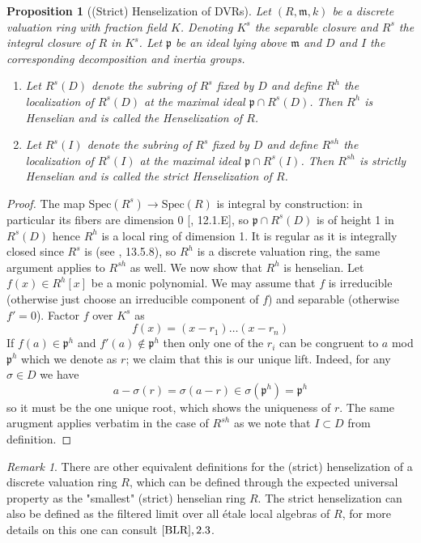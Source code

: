 \documentclass{article}
\theoremstyle{definition}
\theoremstyle{remark}
\newtheorem*{remark}{Remark}
\theoremstyle{plain}
\newtheorem{proposition}[theorem]{Proposition}
\newcommand{\mk}[1]{\mathfrak{#1}}
\newcommand{\ic}{\cap}
\begin{document}
\begin{proposition}[(Strict) Henselization of DVRs]
	Let $(R, \mk{m}, k)$ be a discrete valuation ring with fraction field $K$.
	Denoting $K^s$ the separable closure and $R^s$ the integral closure of $R$ in $K^s$. 
	Let $\mk{p}$ be an ideal lying above $\mk{m}$ and $D$ and $I$ the corresponding decomposition and inertia groups.
	\begin{enumerate}
		\item Let $R^s(D)$ denote the subring of $R^s$ fixed by $D$ and define $R^h$ the localization of $R^s(D)$ at the maximal ideal $\mk{p} \ic R^s(D)$.
		Then $R^h$ is Henselian and is called the \textit{Henselization} of $R$.
	\item Let $R^s(I)$ denote the subring of $R^{s}$ fixed by $D$ and define $R^{sh}$ the localization of $R^s(I)$ at the maximal ideal $\mk{p} \ic R^s(I)$.
		Then $R^{sh}$ is strictly Henselian and is called the \textit{strict Henselization} of $R$.
	\end{enumerate}
	
\end{proposition}

\begin{proof}
The map $\text{Spec}(R^s) \to \text{Spec}(R)$ is integral by construction: in particular its fibers are dimension 0 [\cite{FOAG}, 12.1.E], so $\mk{p} \ic R^s(D)$ is of height 1 in $R^s(D)$ hence $R^h$ is a local ring of dimension 1. 
It is regular as it is integrally closed since $R^s$ is (see \cite{FOAG}, 13.5.8), so $R^h$ is a discrete valuation ring, the same argument applies to $R^{sh}$ as well.\newline
\indent We now show that $R^h$ is henselian.
Let $f(x) \in R^h[x]$ be a monic polynomial. 
We may assume that $f$ is irreducible (otherwise just choose an irreducible component of $f$) and separable (otherwise $f' = 0$).
Factor $f$ over $K^s$ as
\[f(x) = (x - r_1)\dots(x - r_n)\]
If $f(a) \in \mk{p}^h$ and $f'(a) \notin \mk{p}^h$ then only one of the $r_i$ can be congruent to $a$ mod $\mk{p}^h$ which we denote as $r$; we claim that this is our unique lift.
Indeed, for any $\sigma \in D$ we have 
\[a - \sigma(r) = \sigma(a - r) \in \sigma(\mk{p}^h) = \mk{p}^h\]
so it must be the one unique root, which shows the uniqueness of $r$.
The same arugment applies verbatim in the case of $R^{sh}$ as we note that $I \subset D$ from definition.
\end{proof}

\begin{remark}
	There are other equivalent definitions for the (strict) henselization of a discrete valuation ring $R$, which can be defined through the expected universal property as the "smallest" (strict) henselian ring $R$.
	The strict henselization can also be defined as the filtered limit over all \'etale local algebras of $R$, for more details on this one can consult $\cite{BLR}, 2.3$.
\end{remark}
\end{document}
